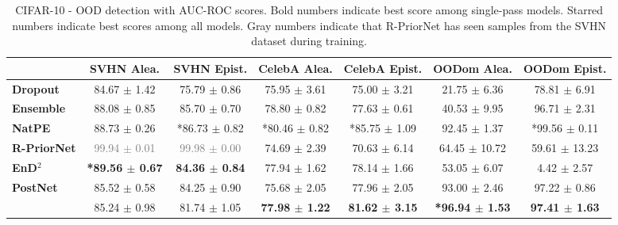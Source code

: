 \begin{table*}[ht]
    \centering
    \caption{CIFAR-10 - OOD detection with AUC-ROC scores. Bold numbers indicate best score among single-pass models. Starred numbers indicate best scores among all models. Gray numbers indicate that R-PriorNet has seen samples from the SVHN dataset during training.}
    \label{tab:auroc-cifar10}
    \scriptsize
    \begin{tabular}{lcccccc}
        \toprule
        & \textbf{SVHN Alea.} & \textbf{SVHN Epist.} & \textbf{CelebA Alea.} & \textbf{CelebA Epist.} & \textbf{OODom Alea.} & \textbf{OODom Epist.} \\
        \midrule
        \textbf{Dropout} & 84.67 $\pm$ 1.42 & 75.79 $\pm$ 0.86 & 75.95 $\pm$ 3.61 & 75.00 $\pm$ 3.21 & 21.75 $\pm$ 6.36 & 78.81 $\pm$ 6.91 \\
        \textbf{Ensemble} & 88.08 $\pm$ 0.85 & 85.70 $\pm$ 0.70 & 78.80 $\pm$ 0.82 & 77.63 $\pm$ 0.61 & 40.53 $\pm$ 9.95 & 96.71 $\pm$ 2.31 \\
        \textbf{NatPE} & 88.73 $\pm$ 0.26 & *86.73 $\pm$ 0.82 & *80.46 $\pm$ 0.82 & *85.75 $\pm$ 1.09 & 92.45 $\pm$ 1.37 & *99.56 $\pm$ 0.11 \\
        \midrule
        \textbf{R-PriorNet} & \textcolor{gray}{99.94 $\pm$ 0.01} & \textcolor{gray}{99.98 $\pm$ 0.00} & 74.69 $\pm$ 2.39 & 70.63 $\pm$ 6.14 & 64.45 $\pm$ 10.72 & 59.61 $\pm$ 13.23 \\
        \textbf{EnD$^2$} & \textbf{*89.56 $\pm$ 0.67} & \textbf{84.36 $\pm$ 0.84} & 77.94 $\pm$ 1.62 & 78.14 $\pm$ 1.66 & 53.05 $\pm$ 6.07 & 4.42 $\pm$ 2.57 \\
        \textbf{PostNet} & 85.52 $\pm$ 0.58 & 84.25 $\pm$ 0.90 & 75.68 $\pm$ 2.05 & 77.96 $\pm$ 2.05 & 93.00 $\pm$ 2.46 & 97.22 $\pm$ 0.86 \\
        \textbf{\oursacro{}} & 85.24 $\pm$ 0.98 & 81.74 $\pm$ 1.05 & \textbf{77.98 $\pm$ 1.22} & \textbf{81.62 $\pm$ 3.15} & \textbf{*96.94 $\pm$ 1.53} & \textbf{97.41 $\pm$ 1.63} \\
        \bottomrule
    \end{tabular}
\end{table*}
